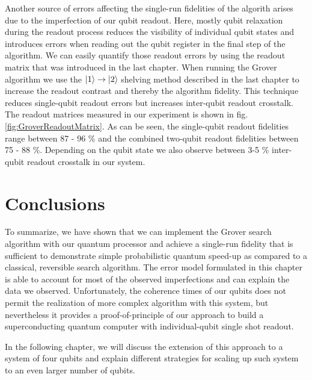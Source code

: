 Another source of errors affecting the single-run fidelities of the algorith arises due to the imperfection of our qubit readout. Here, mostly qubit relaxation during the readout process reduces the visibility of individual qubit states and introduces errors when reading out the qubit register in the final step of the algorithm. We can easily quantify those readout errors by using the readout matrix that was introduced in the last chapter. When running the Grover algorithm we use the $\left| 1 \right>\to\left| 2 \right>$ shelving method described in the last chapter to increase the readout contrast and thereby the algorithm fidelity. This technique reduces single-qubit readout errors but increases inter-qubit readout crosstalk. The readout matrices measured in our experiment is shown in fig. \ref{fig:GroverReadoutMatrix}. As can be seen, the single-qubit readout fidelities range between 87 - 96 \% and the combined two-qubit readout fidelities between 75 - 88 \%. Depending on the qubit state we also observe between 3-5 \% inter-qubit readout crosstalk in our system.

\section{Conclusions}

To summarize, we have shown that we can implement the Grover search algorithm with our quantum processor and achieve a single-run fidelity that is sufficient to demonstrate simple probabilistic quantum speed-up as compared to a classical, reversible search algorithm. The error model formulated in this chapter is able to account for most of the observed imperfections and can explain the data we observed. Unfortunately, the coherence times of our qubits does not permit the realization of more complex algorithm with this system, but nevertheless it provides a proof-of-principle of our approach to build a superconducting quantum computer with individual-qubit single shot readout.

\smallskip

In the following chapter, we will discuss the extension of this approach to a system of four qubits and explain different strategies for scaling up such system to an even larger number of qubits.

